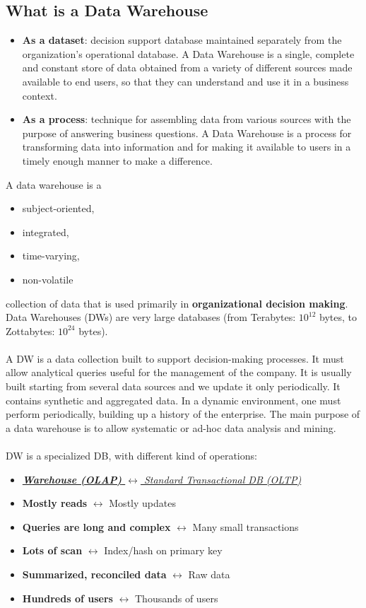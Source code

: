 \documentclass[10pt,a4paper]{article}
\newcommand{\nline}{\\~\\}
\begin{document}
\subsection{What is a Data Warehouse}
\begin{itemize}
	\item \textbf{As a dataset}: decision support database maintained separately from the organization’s operational database. A Data Warehouse is a single, complete and constant store of data obtained from a variety of different sources made available to end users, so that they can understand and use it in a business context.
	\item \textbf{As a process}: technique for assembling data from various sources with the purpose of answering business questions. A Data Warehouse is a process for transforming data into information and for making it available to users in a timely enough manner to make a difference.
\end{itemize}
A data warehouse is a
\begin{itemize}
	\item subject-oriented,
	\item integrated,
	\item time-varying,
	\item non-volatile
\end{itemize} 
collection of data that is used primarily in \textbf{organizational decision making}. \\
Data Warehouses (DWs) are very large databases (from Terabytes: $10^{12}$ bytes, to Zottabytes: $10^{24}$ bytes). \nline
A DW is a data collection built to support decision-making processes. It must allow analytical queries useful for the management of the company. It is usually built starting from several data sources and we update it only periodically. It contains synthetic and aggregated data. In a dynamic environment, one must perform periodically, building up a history of the enterprise. The main purpose of a data warehouse is to allow systematic or ad-hoc data analysis and mining. \nline
DW is a specialized DB, with different kind of operations:
\begin{itemize}
	\item \uline{\textit{\textbf{Warehouse (OLAP)} $\leftrightarrow$ Standard Transactional DB (OLTP)}}
	\item \textbf{Mostly reads} $\leftrightarrow$ Mostly updates
	\item \textbf{Queries are long and complex} $\leftrightarrow$ Many small transactions
	\item \textbf{Lots of scan} $\leftrightarrow$ Index/hash on primary key
	\item \textbf{Summarized, reconciled data} $\leftrightarrow$ Raw data
	\item \textbf{Hundreds of users} $\leftrightarrow$ Thousands of users
\end{itemize}
\end{document}
